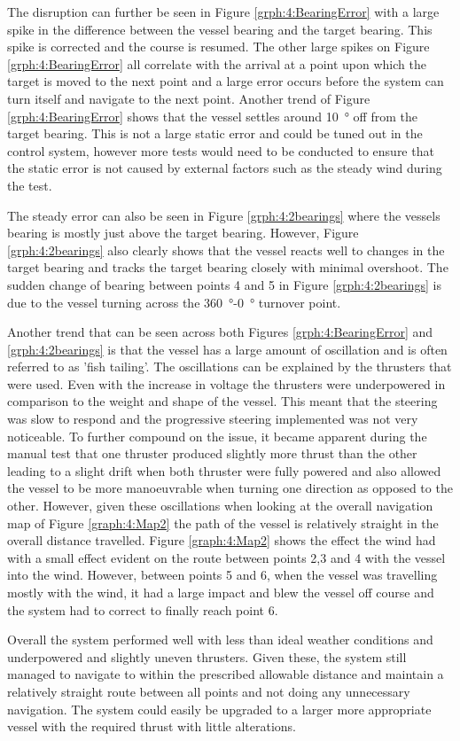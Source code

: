 The disruption can further be seen in Figure \ref{grph:4:BearingError} with a large spike in the difference between the vessel bearing and the target bearing. This spike is corrected and the course is resumed. The other large spikes on Figure \ref{grph:4:BearingError} all correlate with the arrival at a point upon which the target is moved to the next point and a large error occurs before the system can turn itself and navigate to the next point. Another trend of Figure \ref{grph:4:BearingError} shows that the vessel settles around \SI{10}{\degree} off from the target bearing. This is not a large static error and could be tuned out in the control system, however more tests would need to be conducted to ensure that the static error is not caused by external factors such as the steady wind during the test. \par
The steady error can also be seen in Figure \ref{grph:4:2bearings} where the vessels bearing is mostly just above the target bearing. However, Figure \ref{grph:4:2bearings} also clearly shows that the vessel reacts well to changes in the target bearing and tracks the target bearing closely with minimal overshoot. The sudden change of bearing between points 4 and 5 in Figure \ref{grph:4:2bearings} is due to the vessel turning across the \SI{360}{\degree}-\SI{0}{\degree} turnover point. \par
Another trend that can be seen across both Figures \ref{grph:4:BearingError} and \ref{grph:4:2bearings} is that the vessel has a large amount of oscillation and is often referred to as 'fish tailing'. The oscillations can be explained by the thrusters that were used. Even with the increase in voltage the thrusters were underpowered in comparison to the weight and shape of the vessel. This meant that the steering was slow to respond and the progressive steering implemented was not very noticeable. To further compound on the issue, it became apparent during the manual test that one thruster produced slightly more thrust than the other leading to a slight drift when both thruster were fully powered and also allowed the vessel to be more manoeuvrable when turning one direction as opposed to the other. However, given these oscillations when looking at the overall navigation map of Figure \ref{graph:4:Map2} the path of the vessel is relatively straight in the overall distance travelled. Figure \ref{graph:4:Map2} shows the effect the wind had with a small effect evident on the route between points 2,3 and 4 with the vessel into the wind. However, between points 5 and 6, when the vessel was travelling mostly with the wind, it had a large impact and blew the vessel off course and the system had to correct to finally reach point 6.\par
Overall the system performed well with less than ideal weather conditions and underpowered and slightly uneven thrusters. Given these, the system still managed to navigate to within the prescribed allowable distance and maintain a relatively straight route between all points and not doing any unnecessary navigation. The system could easily be upgraded to a larger more appropriate vessel with the required thrust with little alterations.

